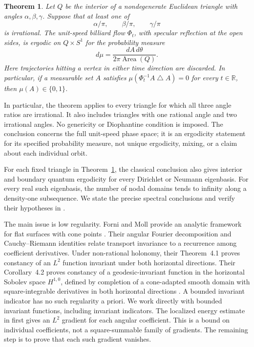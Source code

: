 \documentclass[11pt]{article}
\newtheorem{theorem}{Theorem}
\theoremstyle{remark}
\newcommand{\R}{\mathbb R}
\begin{document}
\begin{theorem}\label{thm:main}
Let \(Q\) be the interior of a nondegenerate Euclidean triangle with angles
\(\alpha,\beta,\gamma\). Suppose that at least one of
\[
 \alpha/\pi,\qquad \beta/\pi,\qquad \gamma/\pi
\]
is irrational.
The unit-speed billiard flow \(\Phi_t\), with specular reflection at the
open sides, is ergodic on \(Q\times S^1\) for the probability measure
\[
 d\mu=\frac{dA\,d\theta}{2\pi\operatorname{Area}(Q)}.
\]
Here trajectories hitting a vertex in either time direction are discarded.
In particular, if a measurable set \(A\) satisfies
\(\mu(\Phi_t^{-1}A\mathbin\triangle A)=0\) for every \(t\in\R\), then
\(\mu(A)\in\{0,1\}\).
\end{theorem}

In particular, the theorem applies to every triangle for which all three
angle ratios are irrational. It also includes triangles with one rational
angle and two irrational angles. No genericity or Diophantine condition
is imposed. The conclusion concerns the full unit-speed phase space;
it is an ergodicity statement for its specified probability measure,
not unique ergodicity, mixing, or a claim about each individual orbit.

For each fixed triangle in Theorem~\ref{thm:main}, the classical
conclusion also gives interior and boundary quantum ergodicity for every
Dirichlet or Neumann eigenbasis. For every real such eigenbasis, the
number of nodal domains tends to infinity along a density-one
subsequence. We state the precise spectral conclusions and verify their
hypotheses in .

The main issue is low regularity. Forni and Moll provide an analytic
framework for flat surfaces with cone points \cite{FM}. Their angular
Fourier decomposition and Cauchy--Riemann identities relate transport
invariance to a recurrence among coefficient derivatives. Under
non-rational holonomy, their Theorem~4.1 proves constancy of an
\(L^2\) function invariant under both horizontal directions. Their
Corollary~4.2 proves constancy of a geodesic-invariant function in the
horizontal Sobolev space \(H^{1,0}\), defined by completion of a
cone-adapted smooth domain with square-integrable derivatives in both
horizontal directions \cite[Section~3.4]{FM}. A bounded invariant
indicator has no such regularity a priori.
We work directly with bounded invariant functions, including invariant
indicators. The localized energy estimate in  first
gives an \(L^2\) gradient for each angular coefficient. This is a bound
on individual coefficients, not a square-summable family of gradients.
The remaining step is to prove that each such gradient vanishes.
\end{document}
